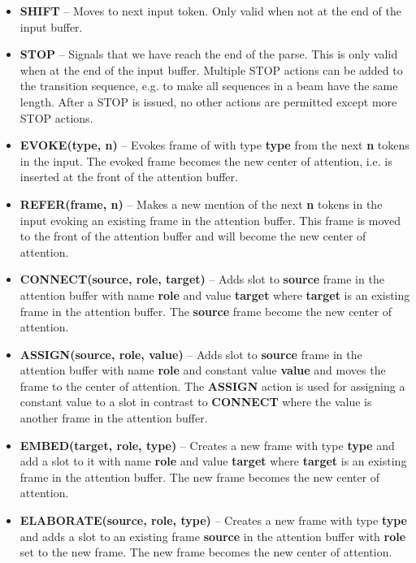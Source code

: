 \documentclass[11pt,a4paper]{article}
\begin{document}
\begin{itemize}
  \item {\bf SHIFT} -- Moves to next input token. Only valid when not at the
        end of the input buffer.
  \item {\bf STOP} -- Signals that we have reach the end of the parse. This is
        only valid when at the end of the input buffer. Multiple STOP actions
        can be added to the transition sequence, e.g. to make all sequences in a
        beam have the same length. After a STOP is issued, no other actions are
        permitted except more STOP actions.
  \item {\bf EVOKE(type, n)} -- Evokes frame of with type {\bf type} from
        the next {\bf n} tokens in the input. The evoked frame becomes the new
        center of attention, i.e. is inserted at the front of the attention
        buffer.
  \item {\bf REFER(frame, n)} -- Makes a new mention of the next {\bf n} tokens
        in the input evoking an existing frame in the attention buffer. This
        frame is moved to the front of the attention buffer and will become the
        new center of attention.
  \item {\bf CONNECT(source, role, target)} -- Adds slot to {\bf source} frame
        in the attention buffer with name {\bf role} and value {\bf target}
        where {\bf target} is an existing frame in the attention buffer. The
        {\bf source} frame become the new center of attention.
  \item {\bf ASSIGN(source, role, value)} -- Adds slot to {\bf source} frame in
        the attention buffer with name {\bf role} and constant value {\bf value}
        and moves the frame to the center of attention. The {\bf ASSIGN} action
        is used for assigning a constant value to a slot in contrast to
        {\bf CONNECT} where the value is another frame in the attention buffer.
  \item {\bf EMBED(target, role, type)} -- Creates a new frame with
        type {\bf type} and add a slot to it with name {\bf role} and value
        {\bf target} where {\bf target} is an existing frame in the attention
        buffer. The new frame becomes the new center of attention.
  \item {\bf ELABORATE(source, role, type)} -- Creates a new frame with type
        {\bf type} and adds a slot to an existing frame {\bf source} in the
        attention buffer with {\bf role} set to the new frame. The new frame
        becomes the new center of attention.
\end{itemize}
\end{document}
